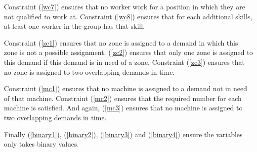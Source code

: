 \documentclass[../../thesis.tex]{subfiles}
\begin{document}
Constraint (\ref{wc7}) ensures that no worker work for a position in which they are not qualified to work at. 
Constraint (\ref{wc8}) ensures that for each additional skills, at least one worker in the group has that skill.

Constraint (\ref{zc1}) ensures that no zone is assigned to a demand in which this zone is not a possible assignment. (\ref{zc2}) ensures that only one zone is assigned to this demand if this demand is in need of a zone. Constraint (\ref{zc3}) ensures that no zone is assigned to two overlapping demands in time.

Constraint (\ref{mc1}) ensures that no machine is assigned to a demand not in need of that machine. Constraint (\ref{mc2}) ensures that the required number for each machine is satisfied. And again, (\ref{mc3}) ensures that no machine is assigned to two overlapping demands in time.


Finally (\ref{binary1}), (\ref{binary2}), (\ref{binary3}) and (\ref{binary4}) ensure the variables only takes binary values.
\end{document}
